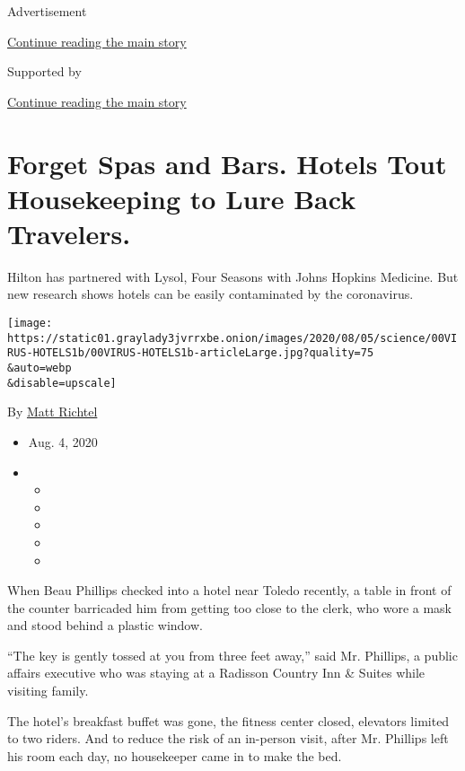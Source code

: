 Advertisement

\protect\hyperlink{after-top}{Continue reading the main story}

Supported by

\protect\hyperlink{after-sponsor}{Continue reading the main story}

\hypertarget{forget-spas-and-bars-hotels-tout-housekeeping-to-lure-back-travelers}{%
\section{Forget Spas and Bars. Hotels Tout Housekeeping to Lure Back
Travelers.}\label{forget-spas-and-bars-hotels-tout-housekeeping-to-lure-back-travelers}}

Hilton has partnered with Lysol, Four Seasons with Johns Hopkins
Medicine. But new research shows hotels can be easily contaminated by
the coronavirus.

\texttt{[image: https://static01.graylady3jvrrxbe.onion/images/2020/08/05/science/00VIRUS-HOTELS1b/00VIRUS-HOTELS1b-articleLarge.jpg?quality=75\\\&auto=webp\\\&disable=upscale]}

By \href{https://www.nytimes3xbfgragh.onion/by/matt-richtel}{Matt
Richtel}

\begin{itemize}
\item
  Aug. 4, 2020
\item
  \begin{itemize}
  \item
  \item
  \item
  \item
  \item
  \end{itemize}
\end{itemize}

When Beau Phillips checked into a hotel near Toledo recently, a table in
front of the counter barricaded him from getting too close to the clerk,
who wore a mask and stood behind a plastic window.

``The key is gently tossed at you from three feet away,'' said Mr.
Phillips, a public affairs executive who was staying at a Radisson
Country Inn \& Suites while visiting family.

The hotel's breakfast buffet was gone, the fitness center closed,
elevators limited to two riders. And to reduce the risk of an in-person
visit, after Mr. Phillips left his room each day, no housekeeper came in
to make the bed.

